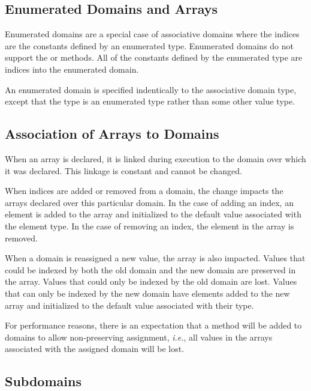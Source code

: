 \subsection{Enumerated Domains and Arrays}
\label{Enumerated_Domains_and_Arrays}

Enumerated domains are a special case of associative domains where the
indices are the constants defined by an enumerated type.  Enumerated
domains do not support the  or  methods.  All
of the constants defined by the enumerated type are indices into the
enumerated domain.

An enumerated domain is specified indentically to the associative
domain type, except that the type is an enumerated type rather than
some other value type.

\subsection{Association of Arrays to Domains}
\label{Association_of_Arrays_to_Domains}

When an array is declared, it is linked during execution to the domain
over which it was declared.  This linkage is constant and cannot be
changed.

When indices are added or removed from a domain, the change impacts
the arrays declared over this particular domain.  In the case of
adding an index, an element is added to the array and initialized to
the default value associated with the element type.  In the case of
removing an index, the element in the array is removed.

When a domain is reassigned a new value, the array is also impacted.
Values that could be indexed by both the old domain and the new domain
are preserved in the array.  Values that could only be indexed by the
old domain are lost.  Values that can only be indexed by the new
domain have elements added to the new array and initialized to the
default value associated with their type.

For performance reasons, there is an expectation that a method will be
added to domains to allow non-preserving assignment, \emph{i.e.}, all
values in the arrays associated with the assigned domain will be lost.

\subsection{Subdomains}
\label{Subdomains}

